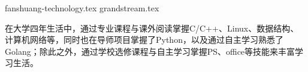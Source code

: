 \documentclass[11pt,letterpaper]{article}
\begin{document}
  \begin{enumSTriangle}[itemsep=0.1cm]
      {fanshuang-technology.tex}
      {grandstream.tex}
  \end{enumSTriangle}

    {\kaishu 在大学四年生活中，通过专业课程与课外阅读掌握C/C++、Linux、数据结构、计算机网络等，同时也在导师项目掌握了Python，以及通过自主学习熟悉了Golang；除此之外，通过学校选修课程与自主学习掌握PS、office等技能来丰富学习生活。}
\end{document}
